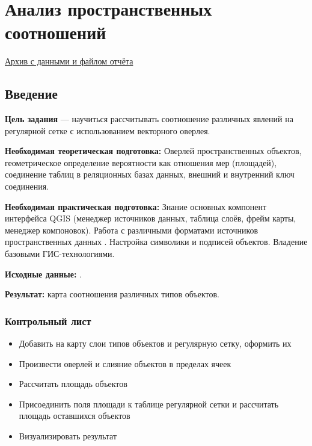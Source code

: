 \documentclass[
  12pt,
]{book}
\providecommand{\tightlist}{%
  \setlength{\itemsep}{0pt}\setlength{\parskip}{0pt}}
\begin{document}
\hypertarget{spatrelations}{%
\chapter{Анализ пространственных соотношений}\label{spatrelations}}

\href{}{Архив с данными и файлом отчёта}

\hypertarget{spatrelations-intro}{%
\section{Введение}\label{spatrelations-intro}}

\textbf{Цель задания} --- научиться рассчитывать соотношение различных явлений на регулярной сетке с использованием векторного оверлея.

\textbf{Необходимая теоретическая подготовка:} Оверлей пространственных объектов, геометрическое определение вероятности как отношения мер (площадей), соединение таблиц в реляционных базах данных, внешний и внутренний ключ соединения.

\textbf{Необходимая практическая подготовка:} Знание основных компонент интерфейса QGIS (менеджер источников данных, таблица слоёв, фрейм карты, менеджер компоновок). Работа с различными форматами источников пространственных данных . Настройка символики и подписей объектов. Владение базовыми ГИС-технологиями.

\textbf{Исходные данные:} .

\textbf{Результат:} карта соотношения различных типов объектов.

\hypertarget{spatrelations-control}{%
\subsection{Контрольный лист}\label{spatrelations-control}}

\begin{itemize}
\tightlist
\item
  Добавить на карту слои типов объектов и регулярную сетку, оформить их
\item
  Произвести оверлей и слияние объектов в пределах ячеек
\item
  Рассчитать площадь объектов
\item
  Присоединить поля площади к таблице регулярной сетки и рассчитать площадь оставшихся объектов
\item
  Визуализировать результат
\end{itemize}
\end{document}
